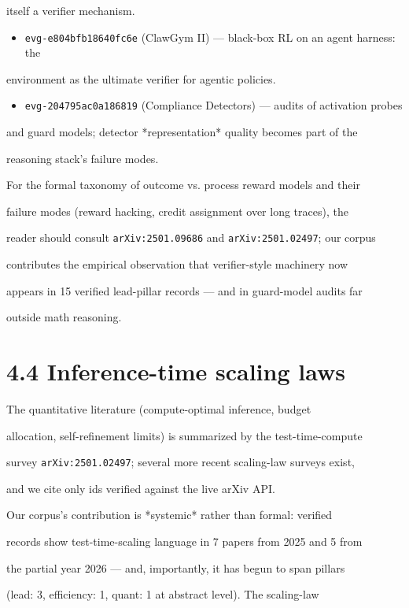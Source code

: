 \documentclass[11pt]{article}
\begin{document}
itself a verifier mechanism.

\begin{itemize}
\item \texttt{evg-e804bfb18640fc6e} (ClawGym II) --- black-box RL on an agent harness: the
\end{itemize}
environment as the ultimate verifier for agentic policies.

\begin{itemize}
\item \texttt{evg-204795ac0a186819} (Compliance Detectors) --- audits of activation probes
\end{itemize}
and guard models; detector *representation* quality becomes part of the

reasoning stack's failure modes.


For the formal taxonomy of outcome vs. process reward models and their

failure modes (reward hacking, credit assignment over long traces), the

reader should consult \texttt{arXiv:2501.09686} and \texttt{arXiv:2501.02497}; our corpus

contributes the empirical observation that verifier-style machinery now

appears in 15 verified lead-pillar records --- and in guard-model audits far

outside math reasoning.


\section{4.4 Inference-time scaling laws}

The quantitative literature (compute-optimal inference, budget

allocation, self-refinement limits) is summarized by the test-time-compute

survey \texttt{arXiv:2501.02497}; several more recent scaling-law surveys exist,

and we cite only ids verified against the live arXiv API.

Our corpus's contribution is *systemic* rather than formal: verified

records show test-time-scaling language in 7 papers from 2025 and 5 from

the partial year 2026 --- and, importantly, it has begun to span pillars

(lead: 3, efficiency: 1, quant: 1 at abstract level). The scaling-law
\end{document}
